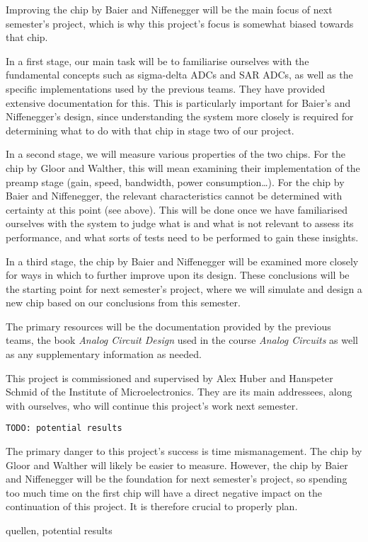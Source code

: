 \documentclass[a4paper,10pt]{article}
\begin{document}
Improving the  chip by Baier  and Niffenegger will be  the main focus  of next
semester's  project, which  is why  this  project's focus  is somewhat  biased
towards that chip.

In a  first stage,  our main task  will be to  familiarise ourselves  with the
fundamental concepts such as sigma-delta ADCs and SAR ADCs, as well as the
specific  implementations  used  by  the previous  teams. They  have  provided
extensive documentation  for this. This is particularly  important for Baier's
and  Niffenegger's design,  since  understanding the  system  more closely  is
required  for determining  what to  do  with that  chip  in stage  two of  our
project.

In a  second stage, we will  measure various properties of  the two chips. For
the chip by  Gloor and Walther, this will mean  examining their implementation
of the preamp stage (gain, speed, bandwidth, power consumption\ldots). For the
chip  by  Baier  and  Niffenegger,  the  relevant  characteristics  cannot  be
determined with certainty at this point (see above). This will be done once we
have familiarised ourselves with  the system to judge what is  and what is not
relevant  to assess  its  performance, and  what  sorts of  tests  need to  be
performed to gain these insights.

In  a  third  stage, the  chip  by  Baier  and  Niffenegger will  be  examined
more  closely for  ways in  which to  further improve  upon its  design. These
conclusions will be  the starting point for next semester's  project, where we
will  simulate and  design  a new  chip  based on  our  conclusions from  this
semester.

The  primary resources  will be  the  documentation provided  by the  previous
teams, the book  \emph{Analog Circuit Design} used in  the course \emph{Analog
Circuits} as well as any supplementary information as needed.

This project is commissioned and supervised by Alex Huber and Hanspeter Schmid
of the Institute of Microelectronics. They are its main addressees, along with
ourselves, who will continue this project's work next semester.

\texttt{TODO: potential results}

The primary  danger to this  project's success  is time mismanagement. The chip  by Gloor  and Walther  will likely  be easier  to measure.
However, the  chip by Baier  and Niffenegger will  be the foundation  for next
semester's project, so  spending too much time  on the first chip  will have a
direct negative  impact on the  continuation of this project. It  is therefore
crucial to properly plan.


quellen, potential results
\end{document}
